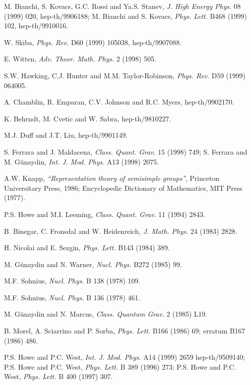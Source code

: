 \documentclass[a4paper,12pt]{article}
\begin{document}
\begin{thebibliography}{99}
M. Bianchi, S. Kovacs, G.C. Rossi and Ya.S. Stanev, {\it J. High 
Energy Phys.} 08 (1999) 020, hep-th/9906188; M. Bianchi and S. 
Kovacs, {\it Phys. Lett.} B468 (1999) 102, hep-th/9910016. 

W. Skiba, {\it Phys. Rev.} D60 (1999) 105038, hep-th/9907088. 

 E. Witten, {\it Adv. Theor. Math. Phys.} 2 (1998) 
505.

 S.W. Hawking, C.J. Hunter and M.M. Taylor-Robinson, 
{\it Phys. Rev.} D59 (1999) 064005.

 A. Chamblin, R. Emparan, C.V. Johnson and R.C. Myers, hep-th/9902170. 

 K. Behrndt, M. Cvetic and W. Sabra, hep-th/9810227.

 M.J. Duff and J.T. Liu, hep-th/9901149. 


 S. Ferrara and J. Maldacena, {\it Class. Quant. Grav.} 15 (1998) 749; 
S. Ferrara and M. G\"unaydin, {\it  Int. J. Mod. Phys.} A13 (1998) 
2075. 

A.W. Knapp, {\sl ``Representation theory of semisimple groups''}, 
Princeton Universitary Press, 1986; Encyclopedic Dictionary of 
Mathematics, MIT Press (1977). 

 P.S. Howe and M.I. Leeming, {\it Class. Quant. Grav.} 
11 (1994) 2843. 
  
 B. Binegar, C. Fronsdal and W. Heidenreich, {\it J. Math. 
Phys.} 24 (1983) 2828. 

H. Nicolai and E. Sezgin, {\it  Phys. Lett.} B143 (1984) 389. 

 M. G\"unaydin and N. Warner, {\it Nucl. Phys.} B272 (1985) 99. 

 
 M.F. Sohnius, {\it Nucl. Phys.}  B 138 (1978) 109.


 M.F. Sohnius, {\it Nucl. Phys.}  B 136 (1978) 461.


M. G\"unaydin and N. Marcus, {\it Class. Quantum Grav.} 2 (1985) 
L19. 


B. Morel, A. Sciarrino and P. Sorba, {\it Phys. Lett.} B166 (1986) 
69; erratum B167 (1986) 486. 


 P.S. Howe and P.C. West, {\it  Int. J. Mod. Phys.} A14 (1999) 2659
hep-th/9509140; P.S. Howe and P.C. West, {\it Phys. Lett.} B 389 
(1996) 273; P.S. Howe and P.C. West, {\it Phys. Lett.} B 400 
(1997) 307. 



\end{thebibliography}
\end{document}
